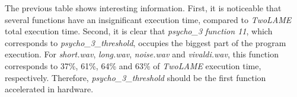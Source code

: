 \vspace{1cm}

The previous table shows interesting information. First, it is noticeable that several functions have an insignificant execution time, compared to \textit{TwoLAME} total execution time. Second, it is clear that \textit{psycho\_3 function 11}, which corresponds to \textit{psycho\_3\_threshold}, occupies the biggest part of the program execution. For \textit{short.wav}, \textit{long.wav}, \textit{noise.wav} and \textit{vivaldi.wav}, this function corresponds to 37\%, 61\%, 64\% and 63\% of \textit{TwoLAME} execution time, respectively.
Therefore, \textit{psycho\_3\_threshold} should be the first function accelerated in hardware.

